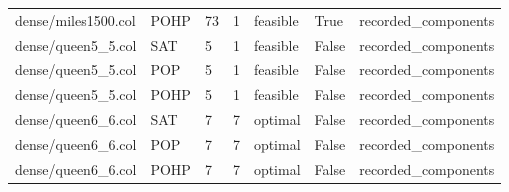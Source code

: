 \begin{table}[htbp]
\begin{tabular}{lllllll}
dense/miles1500.col & POHP & 73 & 1 & feasible & True & recorded\_components \\
dense/queen5\_5.col & SAT & 5 & 1 & feasible & False & recorded\_components \\
dense/queen5\_5.col & POP & 5 & 1 & feasible & False & recorded\_components \\
dense/queen5\_5.col & POHP & 5 & 1 & feasible & False & recorded\_components \\
dense/queen6\_6.col & SAT & 7 & 7 & optimal & False & recorded\_components \\
dense/queen6\_6.col & POP & 7 & 7 & optimal & False & recorded\_components \\
dense/queen6\_6.col & POHP & 7 & 7 & optimal & False & recorded\_components \\
\hline
\end{tabular}
\end{table}
